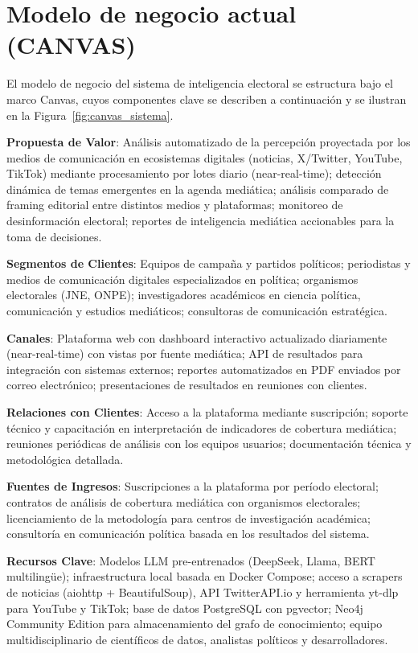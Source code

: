 \section{Modelo de negocio actual (CANVAS)}

El modelo de negocio del sistema de inteligencia electoral se estructura bajo el marco Canvas, cuyos componentes clave se describen a continuación y se ilustran en la Figura~\ref{fig:canvas_sistema}.

\textbf{Propuesta de Valor}: Análisis automatizado de la percepción proyectada por los medios de comunicación en ecosistemas digitales (noticias, X/Twitter, YouTube, TikTok) mediante procesamiento por lotes diario (near-real-time); detección dinámica de temas emergentes en la agenda mediática; análisis comparado de framing editorial entre distintos medios y plataformas; monitoreo de desinformación electoral; reportes de inteligencia mediática accionables para la toma de decisiones.

\textbf{Segmentos de Clientes}: Equipos de campaña y partidos políticos; periodistas y medios de comunicación digitales especializados en política; organismos electorales (JNE, ONPE); investigadores académicos en ciencia política, comunicación y estudios mediáticos; consultoras de comunicación estratégica.

\textbf{Canales}: Plataforma web con dashboard interactivo actualizado diariamente (near-real-time) con vistas por fuente mediática; API de resultados para integración con sistemas externos; reportes automatizados en PDF enviados por correo electrónico; presentaciones de resultados en reuniones con clientes.

\textbf{Relaciones con Clientes}: Acceso a la plataforma mediante suscripción; soporte técnico y capacitación en interpretación de indicadores de cobertura mediática; reuniones periódicas de análisis con los equipos usuarios; documentación técnica y metodológica detallada.

\textbf{Fuentes de Ingresos}: Suscripciones a la plataforma por período electoral; contratos de análisis de cobertura mediática con organismos electorales; licenciamiento de la metodología para centros de investigación académica; consultoría en comunicación política basada en los resultados del sistema.

\textbf{Recursos Clave}: Modelos LLM pre-entrenados (DeepSeek, Llama, BERT multilingüe); infraestructura local basada en Docker Compose; acceso a scrapers de noticias (aiohttp + BeautifulSoup), API TwitterAPI.io y herramienta yt-dlp para YouTube y TikTok; base de datos PostgreSQL con pgvector; Neo4j Community Edition para almacenamiento del grafo de conocimiento; equipo multidisciplinario de científicos de datos, analistas políticos y desarrolladores.

